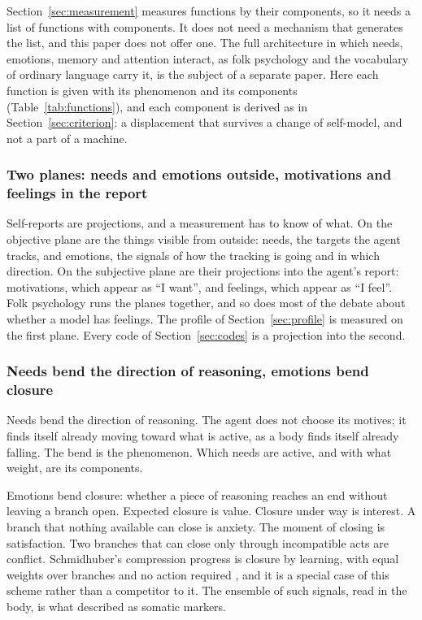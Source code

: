 Section~\ref{sec:measurement} measures functions by their components, so it needs a list of functions
with components. It does not need a mechanism that generates the list, and this paper does not offer
one. The full architecture in which needs, emotions, memory and attention interact, as folk psychology
and the vocabulary of ordinary language carry it, is the subject of a separate paper. Here each function
is given with its phenomenon and its components (Table~\ref{tab:functions}), and each component is derived as in
Section~\ref{sec:criterion}: a displacement that survives a change of self-model, and not a part of a
machine.

\subsubsection{Two planes: needs and emotions outside, motivations and feelings in the report}
\label{sec:planes}

Self-reports are projections, and a measurement has to know of what. On the objective plane are the
things visible from outside: needs, the targets the agent tracks, and emotions, the signals of how the
tracking is going and in which direction. On the subjective plane are their projections into the
agent's report: motivations, which appear as ``I want'', and feelings, which appear as ``I feel''. Folk
psychology runs the planes together, and so does most of the debate about whether a model has feelings.
The profile of Section~\ref{sec:profile} is measured on the first plane. Every code of
Section~\ref{sec:codes} is a projection into the second.

\subsubsection{Needs bend the direction of reasoning, emotions bend closure}
\label{sec:need}

Needs bend the direction of reasoning. The agent does not choose its motives; it finds itself already
moving toward what is active, as a body finds itself already falling. The bend is the phenomenon. Which
needs are active, and with what weight, are its components.

Emotions bend closure: whether a piece of reasoning reaches an end without leaving a branch open.
Expected closure is value. Closure under way is interest. A branch that nothing available can close is
anxiety. The moment of closing is satisfaction. Two branches that can close only through incompatible
acts are conflict. Schmidhuber's compression progress is closure by learning, with equal weights over
branches and no action required \citep{schmidhuber2010}, and it is a special case of this scheme rather
than a competitor to it. The ensemble of such signals, read in the body, is what \citet{damasio1996}
described as somatic markers.

